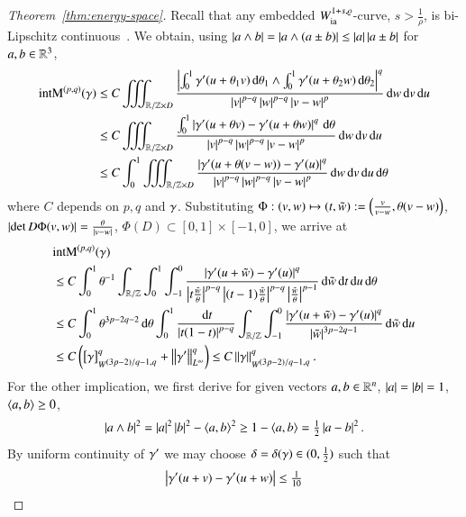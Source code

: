 \begin{proof}[Theorem~\ref{thm:energy-space}]
Recall that any embedded $\Wia[1+s,\rho]$-curve, $s>\tfrac1\rho$, is bi-Lipschitz continuous~\cite[Lemma~2.1]{blatt:bre}.
We obtain, using $\abs{a\wedge b}=\abs{a\wedge(a\pm b)}\le\abs a\abs{a\pm b}$ for $a,b\in\R^{3}$,
\begin{align*}
 \E(\g) &\le C \iiint_{\R/\Z\times D}\frac{\abs{\int_0^1\dg(u+\theta_{1} v)\d\theta_{1}\wedge
 \int_0^1\dg(u+\theta_{2} w)\d\theta_{2}}^{q}}{\abs v^{p-q}\abs w^{p-q}\abs{v-w}^{p}} \d w\d v\d u\\
 &\le C \tint\frac{\int_0^1\abs{\dg(u+\theta v)-\dg(u+\theta w)}^{q}\d\theta}{\abs v^{p-q}\abs w^{p-q}\abs{v-w}^{p}} \d w\d v\d u\\
 &\le C \int_0^1\tint\frac{\abs{\dg(u+\theta (v-w))-\dg(u)}^{q}}{\abs v^{p-q}\abs w^{p-q}\abs{v-w}^{p}} \d w\d v\d u\d\theta
\end{align*}
where $C$ depends on $p,q$ and $\g$.
Substituting
$\Phi:(v,w)\mapsto (t,\tilde w) := \br{\frac v{v-w},\theta(v-w)}$,
$\abs{\det D\Phi(v,w)} = \frac\theta{\abs{v-w}}$,
$\Phi(D)\subset[0,1]\times[-1,0]$,
we arrive at
\begin{equation}\label{eq:intM<seminorm}
\begin{split}
 &\E(\g) \\
 &\le C \int_{0}^{1}\theta^{-1}\int_{\R/\Z}\int_{0}^{1}\int_{-1}^{0}
 \frac{\abs{\dg(u+\tilde w)-\dg(u)}^{q}}{\abs {t\frac{\tilde w}\theta}^{p-q}\abs{(t-1)\frac{\tilde w}\theta}^{p-q}\abs{\frac{\tilde w}\theta}^{p-1}} \d\tilde w\d t\d u\d\theta \\
 &\le C \int_{0}^{1}{\theta^{3p-2q-2}}\d\theta
 \int_{0}^{1}\frac{\d t}{\abs{t(1-t)}^{p-q}}
 \int_{\R/\Z}\int_{-1}^{0}
 \frac{\abs{\dg(u+\tilde w)-\dg(u)}^{q}}{\abs {\tilde w}^{3p-2q-1}} \d\tilde w\d u \\
 &\le C\br{\seminorm{\g}_{\W}^{q}+\lnorm[\infty]\dg^{q}}
 \le C\norm{\g}_{\W}^{q}.
\end{split}
\end{equation}
For the other implication, we first derive for given vectors
$a,b\in\R^{n}$, $\abs a=\abs b=1$, $\sp{a,b}\ge0$,
\begin{equation}\label{eq:a-wedge-b}
 \abs{a\wedge b}^{2} = \abs a^{2}\abs b^{2}-\sp{a,b}^{2}
   \ge1-\sp{a,b}=\tfrac12\abs{a-b}^{2}.
\end{equation}
By uniform continuity of $\dg$
we may choose $\delta=\delta(\g)\in(0,\tfrac12)$ such that
\begin{equation}
 \abs{\dg(u+v)-\dg(u+w)} \le \tfrac1{10}

\end{equation}
\end{proof}
